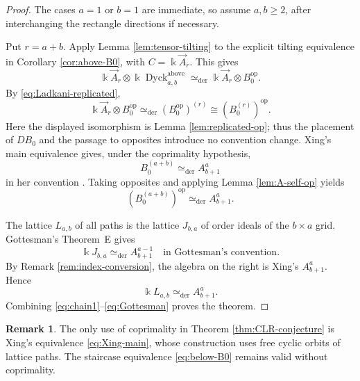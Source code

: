 \documentclass[12pt,a4paper,english,reqno]{amsart}
\theoremstyle{plain}
\theoremstyle{definition}
\newtheorem{remark}[theorem]{Remark}
\newcommand{\kk}{\Bbbk}
\newcommand{\Dyck}{\operatorname{Dyck}}
\newcommand{\op}{\mathrm{op}}
\begin{document}
\begin{proof}
The cases $a=1$ or $b=1$ are immediate, so assume $a,b\geq2$, after
interchanging the rectangle directions if necessary.

Put $r=a+b$.  Apply Lemma \ref{lem:tensor-tilting} to the explicit tilting
equivalence in Corollary \ref{cor:above-B0}, with $C=\kk\vec A_r$.  This gives
\begin{equation}
 \kk\vec A_r\otimes
 \kk\Dyck^{\mathrm{above}}_{a,b}
 \simeq_{\mathrm{der}}
 \kk\vec A_r\otimes B_0^{\op}.
\label{eq:chain1}
\end{equation}
By \eqref{eq:Ladkani-replicated},
\begin{equation}
 \kk\vec A_r\otimes B_0^{\op}
 \simeq_{\mathrm{der}}
 (B_0^{\op})^{(r)}
 \cong(B_0^{(r)})^{\op}.
\label{eq:chain2}
\end{equation}
Here the displayed isomorphism is Lemma \ref{lem:replicated-op}; thus the
placement of $D B_0$ and the passage to opposites introduce no convention
change.
Xing's main equivalence gives, under the coprimality hypothesis,
\begin{equation}
 B_0^{(a+b)}\simeq_{\mathrm{der}}A_{b+1}^{a}
\label{eq:Xing-main}
\end{equation}
in her convention \cite[Theorem~4.5 and Proposition~4.25]{Xing}.  Taking
opposites and applying Lemma \ref{lem:A-self-op} yields
\begin{equation}
 (B_0^{(a+b)})^{\op}
 \simeq_{\mathrm{der}}A_{b+1}^{a}.
\label{eq:chain3}
\end{equation}

The lattice $L_{a,b}$ of all paths is the lattice
$J_{b,a}$ of order ideals of the $b\times a$ grid.  Gottesman's
Theorem~E gives
\[
 \kk J_{b,a}
 \simeq_{\mathrm{der}} A_{b+1}^{a-1}
 \quad\text{in Gottesman's convention}.
\]
By Remark \ref{rem:index-conversion}, the algebra on the right is Xing's
$A_{b+1}^{a}$.  Hence
\begin{equation}
 \kk L_{a,b}\simeq_{\mathrm{der}}A_{b+1}^{a}.
\label{eq:Gottesman}
\end{equation}
Combining \eqref{eq:chain1}--\eqref{eq:Gottesman} proves the theorem.
\end{proof}

\begin{remark}
The only use of coprimality in Theorem \ref{thm:CLR-conjecture} is Xing's
equivalence \eqref{eq:Xing-main}, whose construction uses free cyclic orbits
of lattice paths.  The staircase equivalence
\eqref{eq:below-B0} remains valid without coprimality.
\end{remark}
\end{document}
